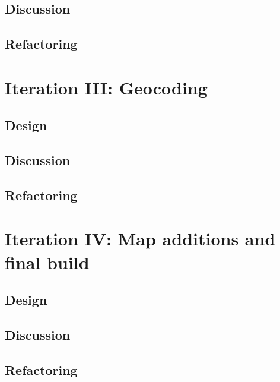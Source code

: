 \subsection{Discussion}

\subsection{Refactoring}
\section{Iteration III: Geocoding}
\subsection{Design}

\subsection{Discussion}

\subsection{Refactoring}

\section{Iteration IV: Map additions and final build}

\subsection{Design}

\subsection{Discussion}

\subsection{Refactoring}